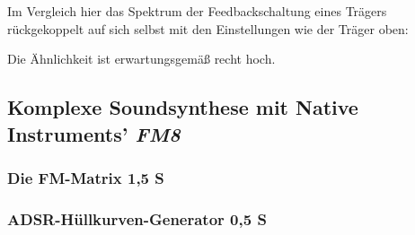 Im Vergleich hier das Spektrum der Feedbackschaltung eines Trägers rückgekoppelt auf sich selbst mit den Einstellungen wie der Träger oben:

Die Ähnlichkeit ist erwartungsgemäß recht hoch.

\subsection{Komplexe Soundsynthese mit Native Instruments' \textit{FM8}}

\subsubsection{Die FM-Matrix 1,5 S}


\subsubsection{ADSR-Hüllkurven-Generator 0,5 S}
